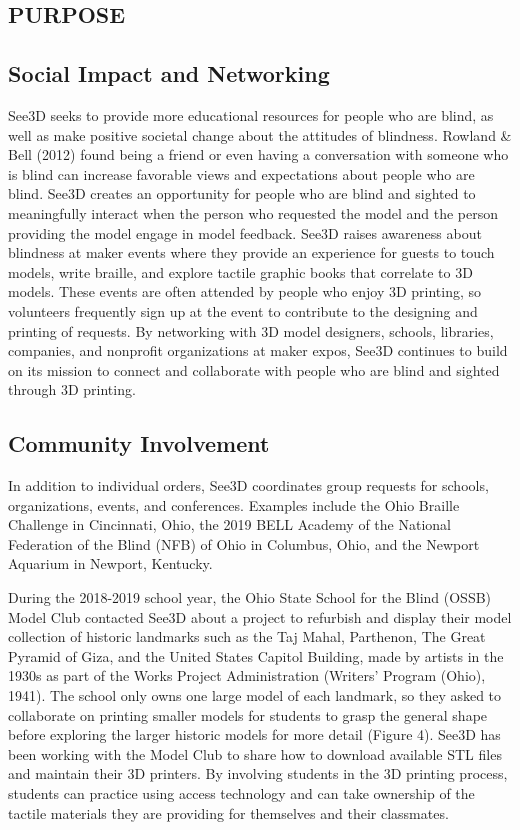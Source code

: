 \documentclass[11.5pt]{sig-alternate} %
\begin{document}
\begin{large}
\section*{PURPOSE}

\subsection*{Social Impact and Networking}

See3D seeks to provide more educational resources for people who are blind, as well as make positive societal change about the attitudes of blindness. Rowland \& Bell (2012) found being a friend or even having a conversation with someone who is blind can increase favorable views and expectations about people who are blind. See3D creates an opportunity for people who are blind and sighted to meaningfully interact when the person who requested the model and the person providing the model engage in model feedback. See3D raises awareness about blindness at maker events where they provide an experience for guests to touch models, write braille, and explore tactile graphic books that correlate to 3D models. These events are often attended by people who enjoy 3D printing, so volunteers frequently sign up at the event to contribute to the designing and printing of requests. By networking with 3D model designers, schools, libraries, companies, and nonprofit organizations at maker expos, See3D continues to build on its mission to connect and collaborate with people who are blind and sighted through 3D printing.

\subsection*{Community Involvement}

In addition to individual orders, See3D coordinates group requests for schools, organizations, events, and conferences. Examples include the Ohio Braille Challenge in Cincinnati, Ohio, the 2019 BELL Academy of the National Federation of the Blind (NFB) of Ohio in Columbus, Ohio, and the Newport Aquarium in Newport, Kentucky.

During the 2018-2019 school year, the Ohio State School for the Blind (OSSB) Model Club contacted See3D about a project to refurbish and display their model collection of historic landmarks such as the Taj Mahal, Parthenon, The Great Pyramid of Giza, and the United States Capitol Building, made by artists in the 1930s as part of the Works Project Administration (Writers' Program (Ohio), 1941). The school only owns one large model of each landmark, so they asked to collaborate on printing smaller models for students to grasp the general shape before exploring the larger historic models for more detail (Figure 4). See3D has been working with the Model Club to share how to download available STL files and maintain their 3D printers. By involving students in the 3D printing process, students can practice using access technology and can take ownership of the tactile materials they are providing for themselves and their classmates. 


\end{large}
\end{document}
